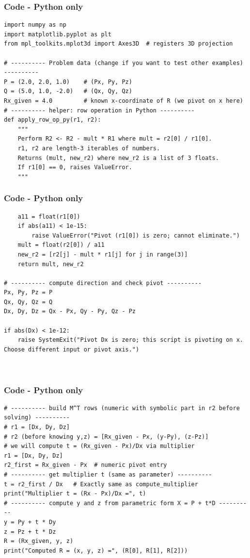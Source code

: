 \documentclass{beamer}
\theoremstyle{remark}
\numberwithin{equation}{section}
\begin{document}
\begin{frame}[fragile]
\frametitle{Code - Python only}
\begin{lstlisting}
import numpy as np
import matplotlib.pyplot as plt
from mpl_toolkits.mplot3d import Axes3D  # registers 3D projection

# ---------- Problem data (change if you want to test other examples) ----------
P = (2.0, 2.0, 1.0)    # (Px, Py, Pz)
Q = (5.0, 1.0, -2.0)   # (Qx, Qy, Qz)
Rx_given = 4.0         # known x-coordinate of R (we pivot on x here)
# ---------- helper: row operation in Python ----------
def apply_row_op_py(r1, r2):
    """
    Perform R2 <- R2 - mult * R1 where mult = r2[0] / r1[0].
    r1, r2 are length-3 iterables of numbers.
    Returns (mult, new_r2) where new_r2 is a list of 3 floats.
    If r1[0] == 0, raises ValueError.
    """
\end{lstlisting}
\end{frame}
\begin{frame}[fragile]
\frametitle{Code - Python only}
\begin{lstlisting}
    a11 = float(r1[0])
    if abs(a11) < 1e-15:
        raise ValueError("Pivot (r1[0]) is zero; cannot eliminate.")
    mult = float(r2[0]) / a11
    new_r2 = [r2[j] - mult * r1[j] for j in range(3)]
    return mult, new_r2

# ---------- compute direction and check pivot ----------
Px, Py, Pz = P
Qx, Qy, Qz = Q
Dx, Dy, Dz = Qx - Px, Qy - Py, Qz - Pz

if abs(Dx) < 1e-12:
    raise SystemExit("Pivot Dx is zero; this script is pivoting on x. Choose different input or pivot axis.")



\end{lstlisting}
\end{frame}

\begin{frame}[fragile]
\frametitle{Code - Python only}
\begin{lstlisting}
# ---------- build M^T rows (numeric with symbolic part in r2 before solving) ----------
# r1 = [Dx, Dy, Dz]
# r2 (before knowing y,z) = [Rx_given - Px, (y-Py), (z-Pz)]
# we will compute t = (Rx_given - Px)/Dx via multiplier
r1 = [Dx, Dy, Dz]
r2_first = Rx_given - Px  # numeric pivot entry
# ---------- get multiplier t (same as parameter) ----------
t = r2_first / Dx   # Exactly same as compute_multiplier
print("Multiplier t = (Rx - Px)/Dx =", t)
# ---------- compute y and z from parametric form X = P + t*D ----------
y = Py + t * Dy
z = Pz + t * Dz
R = (Rx_given, y, z)
print("Computed R = (x, y, z) =", (R[0], R[1], R[2]))

\end{lstlisting}
\end{frame}
\end{document}
